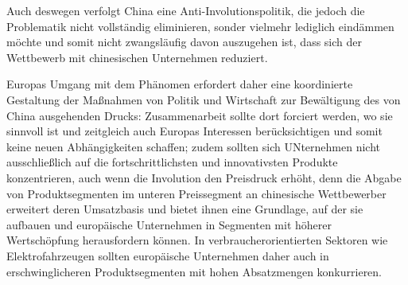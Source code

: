 \documentclass[12pt,a4paper,oneside]{book} %
\begin{document}
{Auch deswegen verfolgt China eine Anti-Involutionspolitik, die jedoch die Problematik nicht vollständig eliminieren, sonder vielmehr lediglich eindämmen möchte und somit nicht zwangsläufig davon auszugehen ist, dass sich der Wettbewerb mit chinesischen Unternehmen reduziert.\autocite{bibid} 

Europas Umgang mit dem Phänomen erfordert daher eine koordinierte Gestaltung der Maßnahmen von Politik und Wirtschaft zur Bewältigung des von China ausgehenden Drucks: Zusammenarbeit sollte dort forciert werden, wo sie sinnvoll ist und zeitgleich auch Europas Interessen berücksichtigen und somit keine neuen Abhängigkeiten schaffen; zudem sollten sich UNternehmen nicht ausschließlich auf die fortschrittlichsten und innovativsten Produkte konzentrieren, auch wenn die Involution den Preisdruck erhöht, denn die Abgabe von Produktsegmenten im unteren Preissegment an chinesische Wettbewerber erweitert deren Umsatzbasis und bietet ihnen eine Grundlage, auf der sie aufbauen und europäische Unternehmen in Segmenten mit höherer Wertschöpfung herausfordern können. In verbraucherorientierten Sektoren wie Elektrofahrzeugen sollten europäische Unternehmen daher auch in erschwinglicheren Produktsegmenten mit hohen Absatzmengen konkurrieren.\autocite{MERICS: Survival of the fiercest: How involution helps China dominate green tech globally}

}
\end{document}
